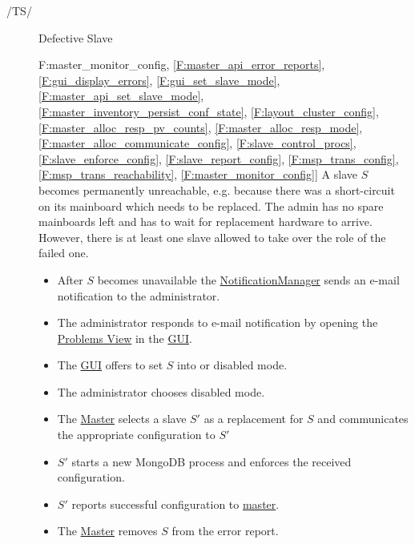 \documentclass[a4paper, 11pt]{article}
\makeatletter
\def\namedlabel#1#2{\begingroup
    #2%
    \def\@currentlabel{#2}%
    \phantomsection\label{#1}\endgroup
}
\newcommand{\oitem}[2]{
  \@ifundefined{c@oitem#1}{\newcounter{oitem#1}}{} %
  \addtocounter{oitem#1}{10}
  \item[\namedlabel{#1:#2}{/#1\arabic{oitem#1}/}]
}
\newcommand{\testsequence}[3][]{
	\begin{description}[leftmargin=!,labelwidth=\widthof{\bfseries Preconditions}]
		\ifthenelse{\equal{#1}{}}
		{} %
		{\item[Tests] #1}
		\item[Preconditions] #2
		\item[Steps] #3
	\end{description}
}
\makeatother
\begin{document}
\begin{description}
\oitem{TS}{} Defective Slave
\testsequence
[\ref{F:master_monitor_config}, \ref{F:master_api_error_reports}, \ref{F:gui_display_errors}, \ref{F:gui_set_slave_mode}, \ref{F:master_api_set_slave_mode}, \ref{F:master_inventory_persist_conf_state}, \ref{F:layout_cluster_config}, \ref{F:master_alloc_resp_pv_counts}, \ref{F:master_alloc_resp_mode}, \ref{F:master_alloc_communicate_config}, \ref{F:slave_control_procs}, \ref{F:slave_enforce_config}, \ref{F:slave_report_config}, \ref{F:msp_trans_config}, \ref{F:msp_trans_reachability}, \ref{F:master_monitor_config}]
{
	A \gls{slave} $S$ becomes permanently unreachable, e.g. because there was a short-circuit on its mainboard which needs to be replaced. The admin has no spare mainboards left and has to wait for replacement hardware to arrive. However, there is at least one  \gls{slave} allowed to take over the role of the failed one.
}
{
	\begin{itemize}
		\item After $S$ becomes unavailable the \hyperref[SM:NotificationManager]{NotificationManager} sends an e-mail notification to the \gls{administrator}.
		\item The \gls{administrator} responds to e-mail notification by opening the  \hyperref[subsec:ui:problems_view]{Problems View} in the \hyperref[SM:GUI]{GUI}.
		\item The \hyperref[SM:GUI]{GUI} offers to set $S$ into  or \gls{disabled mode}.
		\item The \gls{administrator} chooses \gls{disabled mode}.
		\item The \hyperref[SM:Master]{Master} selects a \gls{slave} $S'$ as a replacement for $S$ and communicates the appropriate configuration to $S'$
		\item $S'$ starts a new \gls{MongoDB} process and enforces the received configuration.
		\item $S'$ reports successful configuration to \hyperref[SM:Master]{master}.
		\item The \hyperref[SM:Master]{Master} removes $S$ from the error report.
	\end{itemize}
}



\end{description}
\end{document}
